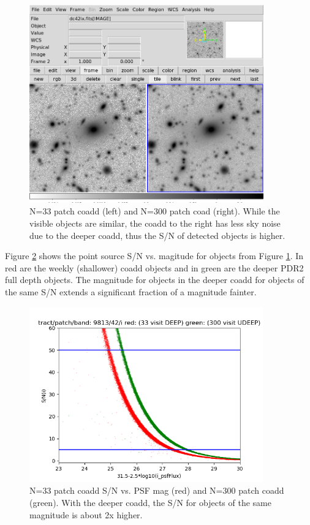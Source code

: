  \begin{figure}[hbt!]
 \includegraphics[width=0.9\textwidth]{sidebyside9813p42bi.png}
	 \caption{N=33 patch coadd (left) and N=300 patch coad (right).  While the visible objects are similar, the coadd to the right has less sky noise due to the deeper coadd, thus the S/N of detected objects is higher.  \label{fig:coadd}}
 \end{figure}


Figure \ref{fig:s2n} shows the point source S/N vs. magitude for objects from Figure \ref{fig:coadd}.  In red are the weekly (shallower) coadd objects and in green are the deeper PDR2 full depth objects.   The
magnitude for objects in the deeper coadd for objects of the same S/N extends a significant 
fraction of a magnitude fainter.

\begin{center}
 \begin{figure}[hbt!]
 \includegraphics[width=0.9\textwidth,natwidth=600,natheight=600]{redgreen31.5.png}
	 \caption{N=33 patch coadd S/N vs. PSF mag (red) and N=300 patch coadd (green).  With the deeper coadd, the S/N for objects of the same magnitude is about 2x higher.  \label{fig:s2n}}
 \end{figure}
\end{center}

